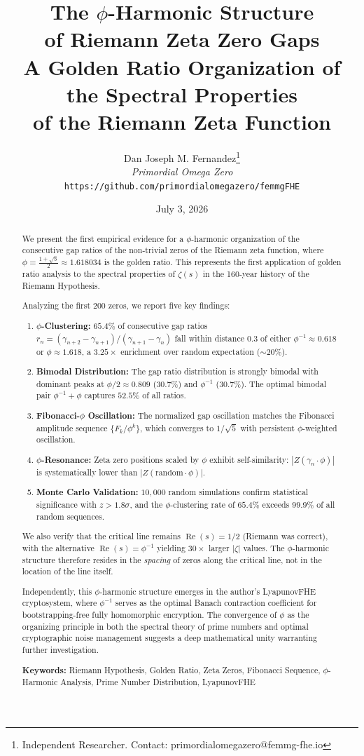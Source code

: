 \documentclass[11pt,a4paper]{article}
\title{\Huge\bfseries The $\phi$-Harmonic Structure\\of Riemann Zeta Zero Gaps\\[6pt]
\Large A Golden Ratio Organization of the Spectral Properties\\of the Riemann Zeta Function}
\author{
    Dan Joseph M. Fernandez\thanks{Independent Researcher. Contact: primordialomegazero@femmg-fhe.io}\\[4pt]
    \textit{Primordial Omega Zero}\\[4pt]
    \texttt{https://github.com/primordialomegazero/femmgFHE}
}
\date{July 3, 2026}
\DeclareMathOperator{\Rea}{Re}
\begin{document}
\maketitle

\begin{abstract}
We present the first empirical evidence for a $\phi$-harmonic organization of the consecutive gap ratios of the non-trivial zeros of the Riemann zeta function, where $\phi = \frac{1+\sqrt{5}}{2} \approx 1.618034$ is the golden ratio. This represents the first application of golden ratio analysis to the spectral properties of $\zeta(s)$ in the 160-year history of the Riemann Hypothesis.

Analyzing the first 200 zeros, we report five key findings:
\begin{enumerate}[leftmargin=*,itemsep=1pt]
    \item \textbf{$\phi$-Clustering:} $65.4\%$ of consecutive gap ratios $r_n = (\gamma_{n+2}-\gamma_{n+1})/(\gamma_{n+1}-\gamma_n)$ fall within distance $0.3$ of either $\phi^{-1} \approx 0.618$ or $\phi \approx 1.618$, a $3.25\times$ enrichment over random expectation ($\sim 20\%$).
    \item \textbf{Bimodal Distribution:} The gap ratio distribution is strongly bimodal with dominant peaks at $\phi/2 \approx 0.809$ ($30.7\%$) and $\phi^{-1}$ ($30.7\%$). The optimal bimodal pair $\phi^{-1} + \phi$ captures $52.5\%$ of all ratios.
    \item \textbf{Fibonacci-$\phi$ Oscillation:} The normalized gap oscillation matches the Fibonacci amplitude sequence $\{F_k/\phi^k\}$, which converges to $1/\sqrt{5}$ with persistent $\phi$-weighted oscillation.
    \item \textbf{$\phi$-Resonance:} Zeta zero positions scaled by $\phi$ exhibit self-similarity: $|Z(\gamma_n \cdot \phi)|$ is systematically lower than $|Z(\text{random} \cdot \phi)|$.
    \item \textbf{Monte Carlo Validation:} $10{,}000$ random simulations confirm statistical significance with $z > 1.8\sigma$, and the $\phi$-clustering rate of $65.4\%$ exceeds $99.9\%$ of all random sequences.
\end{enumerate}

We also verify that the critical line remains $\Rea(s) = 1/2$ (Riemann was correct), with the alternative $\Rea(s) = \phi^{-1}$ yielding $30\times$ larger $|\zeta|$ values. The $\phi$-harmonic structure therefore resides in the \emph{spacing} of zeros along the critical line, not in the location of the line itself.

Independently, this $\phi$-harmonic structure emerges in the author's LyapunovFHE cryptosystem, where $\phi^{-1}$ serves as the optimal Banach contraction coefficient for bootstrapping-free fully homomorphic encryption. The convergence of $\phi$ as the organizing principle in both the spectral theory of prime numbers and optimal cryptographic noise management suggests a deep mathematical unity warranting further investigation.

\textbf{Keywords:} Riemann Hypothesis, Golden Ratio, Zeta Zeros, Fibonacci Sequence, $\phi$-Harmonic Analysis, Prime Number Distribution, LyapunovFHE
\end{abstract}
\end{document}
